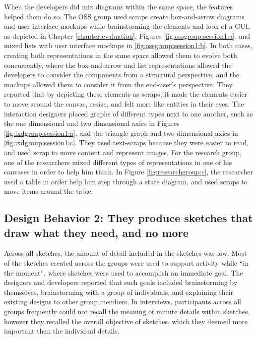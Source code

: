 When the developers did mix diagrams within the same space, the features helped them do so. The OSS group used scraps create box-and-arrow diagrams and user interface mockups while brainstorming the elements and look of a GUI, as depicted in Chapter \ref{chapter:evaluation}, Figures \ref{fig:ossgroup:session1:a}, and mixed lists with user interface mockups in \ref{fig:ossgroup:session1:b}. In both cases, creating both representations in the same space allowed them to evolve both concurrently, where the box-and-arrow and list representations allowed the developers to consider the components from a structural perspective, and the mockups allowed them to consider it from the end-user's perspective. They reported that by depicting these elements as scraps, it made the elements easier to move around the canvas, resize, and felt more like entities in their eyes. The interaction designers placed graphs of different types next to one another, such as the one dimensional and two dimensional axies in Figures \ref{fig:ixdgroup:session1:a}, and the triangle graph and two dimensional axies in \ref{fig:ixdgroup:session1:c}. They used text-scraps because they were easier to read, and used scrap to move content and represent images. For the research group, one of the researchers mixed different types of representations in one of his canvases in order to help him think. In Figure \ref{fig:researchgroup:c}, the researcher used a table in order help him step through a state diagram, and used scraps to move items around the table.


\subsection{Design Behavior 2: They produce sketches that draw what they need, and no more}

Across all sketches, the amount of detail included in the sketches was low. Most of the sketches created across the groups were used to support activity while ``in the moment'', where sketches were used to accomplish an immediate goal. The designers and developers reported that such goals included brainstorming by themselves, brainstorming with a group of individuals, and explaining their existing designs to other group members. In interviews, participants across all groups frequently could not recall the meaning of minute details within sketches, however they recalled the overall objective of sketches, which they deemed more important than the individual details. 

